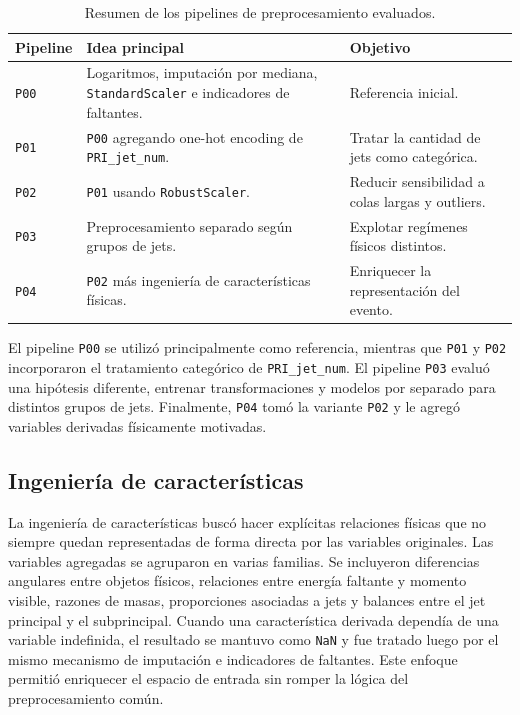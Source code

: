 \documentclass{article}
\begin{document}
\begin{table}[H]
    \centering
    \small
    \begin{tabular}{@{}p{} p{} p{}@{}}
        \toprule
        Pipeline & Idea principal & Objetivo \\
        \midrule
        \texttt{P00} & Logaritmos, imputación por mediana, \texttt{StandardScaler} e indicadores de faltantes. & Referencia inicial. \\
        \texttt{P01} & \texttt{P00} agregando one-hot encoding de \texttt{PRI\_jet\_num}. & Tratar la cantidad de jets como categórica. \\
        \texttt{P02} & \texttt{P01} usando \texttt{RobustScaler}. & Reducir sensibilidad a colas largas y outliers. \\
        \texttt{P03} & Preprocesamiento separado según grupos de jets. & Explotar regímenes físicos distintos. \\
        \texttt{P04} & \texttt{P02} más ingeniería de características físicas. & Enriquecer la representación del evento. \\
        \bottomrule
    \end{tabular}
    \caption{Resumen de los pipelines de preprocesamiento evaluados.}
    \label{tab:pipelines-preprocesamiento}
\end{table}

El pipeline \texttt{P00} se utilizó principalmente como referencia, mientras que \texttt{P01} y \texttt{P02} incorporaron el tratamiento categórico de \texttt{PRI\_jet\_num}. El pipeline \texttt{P03} evaluó una hipótesis diferente, entrenar transformaciones y modelos por separado para distintos grupos de jets. Finalmente, \texttt{P04} tomó la variante \texttt{P02} y le agregó variables derivadas físicamente motivadas.

\subsection{Ingeniería de características}
La ingeniería de características buscó hacer explícitas relaciones físicas que no siempre quedan representadas de forma directa por las variables originales. Las variables agregadas se agruparon en varias familias. Se incluyeron diferencias angulares entre objetos físicos, relaciones entre energía faltante y momento visible, razones de masas, proporciones asociadas a jets y balances entre el jet principal y el subprincipal. Cuando una característica derivada dependía de una variable indefinida, el resultado se mantuvo como \texttt{NaN} y fue tratado luego por el mismo mecanismo de imputación e indicadores de faltantes. Este enfoque permitió enriquecer el espacio de entrada sin romper la lógica del preprocesamiento común.
\end{document}
